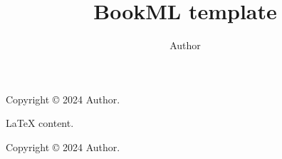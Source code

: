 \documentclass[oneside,11pt]{amsart}
\title{BookML template}
\author{Author}
\begin{document}
\maketitle

\begin{lxFooter}
  Copyright \copyright{} 2024 Author.
\end{lxFooter}

\LaTeX{} content.

\iflatexml\else
\begin{center}
  {\small Copyright \copyright{} 2024 Author.}
\end{center}
\fi
\end{document}
